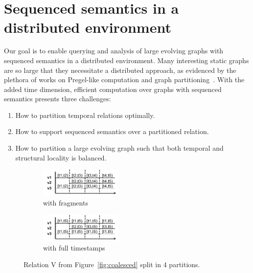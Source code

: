 \section{Sequenced semantics in a \\ distributed environment}
\label{sec:consider}


Our goal is to enable querying and analysis of large evolving graphs
with sequenced semantics in a distributed environment.  Many
interesting static graphs are so large that they necessitate a
distributed approach, as evidenced by the plethora of works on
Pregel-like computation and graph partitioning~\cite{McCune2015}.
With the added time dimension, efficient computation over graphs with
sequenced semantics presents three challenges:

\begin{enumerate}
\item How to partition temporal relations optimally.
\item How to support sequenced semantics over a partitioned relation.
\item How to partition a large evolving graph such that both temporal
  and structural locality is balanced.
\end{enumerate}

\begin{figure}
\begin{subfigure}[b]{1.6in}
\includegraphics[width=1.6in]{figs/split.pdf}
\caption{with fragments}
\label{fig:split}
\end{subfigure}
\begin{subfigure}[b]{1.6in}
\includegraphics[width=1.6in]{figs/split2.pdf}
\caption{with full timestamps}
\label{fig:split2}
\end{subfigure}
\caption{Relation V from Figure~\ref{fig:coalesced} split in 4 partitions.}
\end{figure}

